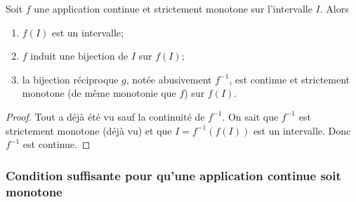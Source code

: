 \begin{theo}
  Soit \(f\) une application continue et strictement monotone sur l'intervalle \(I\). Alors
  \begin{enumerate}
  \item \(f(I)\) est un intervalle;
  \item \(f\) induit une bijection de \(I\) sur \(f(I)\);
  \item la bijection réciproque \(g\), notée abusivement \(f^{-1}\), est continue et strictement monotone (de même monotonie que \(f\)) sur \(f(I)\).
  \end{enumerate}
\end{theo}
\begin{proof}
  Tout a déjà été vu sauf la continuité de \(f^{-1}\). On sait que \(f^{-1}\) est strictement monotone (déjà vu) et que \(I=f^{-1}(f(I))\) est un intervalle. Donc \(f^{-1}\) est continue.
\end{proof}

\subsubsection[Pour qu'une application continue soit monotone]{Condition suffisante pour qu'une application continue soit monotone}

